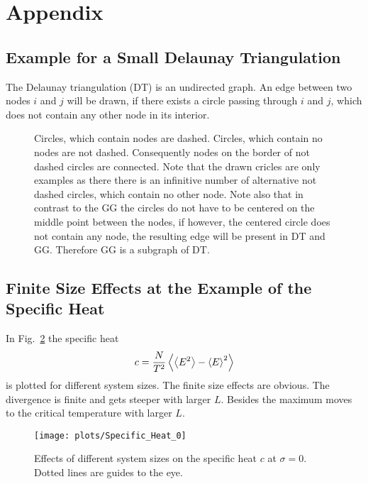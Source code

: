 \section{Appendix}
\subsection{Example for a Small Delaunay Triangulation}
\label{appendix:DT_def}
    The Delaunay triangulation (DT) is an undirected graph. An edge
    between two nodes \(i\) and \(j\) will be drawn, if there exists
    a circle passing through \(i\) and \(j\), which does not contain
    any other node in its interior.
    \begin{figure}[htbp]
    \centering
        
        \label{sfig:def:DT}
        \caption[Example for a Small Delaunay Triangulation]
        {
            Circles, which contain nodes are dashed.
            Circles, which contain no nodes are not dashed.
            Consequently nodes on the border of not dashed circles are
            connected. Note that the drawn cricles are only examples
            as there there is an infinitive number of alternative not
            dashed circles, which contain no other node.
            Note also that in contrast to the GG the circles do not
            have to be centered on the middle point between the nodes, if
            however, the centered circle does not contain any node, the
            resulting edge will be present in DT and GG. Therefore GG is
            a subgraph of DT.
        }
    \end{figure}

\subsection{Finite Size Effects at the Example of the Specific Heat}
\label{appendix:finiteSizeEffects}
    In Fig.\ \ref{fig:smeared_out_appendix} the specific heat
    \begin{equation}
        c = \frac{N}{T^2}\left< \left< E^2 \right> - \left< E \right>^2 \right>
    \end{equation}
    is plotted for different system sizes. The finite size effects are obvious.
    The divergence is finite and gets steeper with larger \(L\). Besides
    the maximum moves to the critical temperature with larger \(L\).
    \begin{figure}[htbp]
        \centering
        \texttt{[image: plots/Specific\_Heat\_0]}
        \caption[Finite Size Effects by Example of the Specific Heat]
        {
            Effects of different system sizes on the specific heat \(c\)
            at \(\sigma = 0\). Dotted lines are guides to the eye.
        }
        \label{fig:smeared_out_appendix}
    \end{figure}
